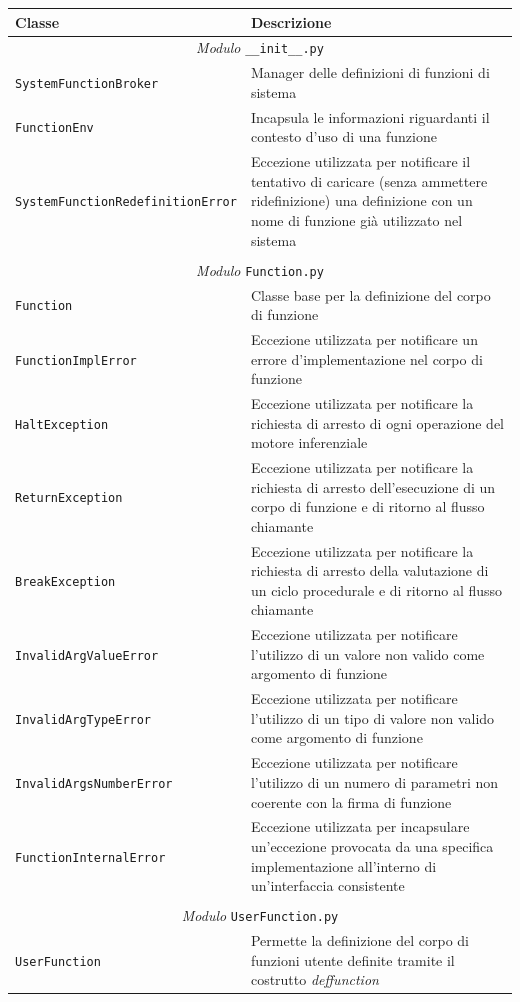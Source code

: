 \begin{longtable}{p{5.5cm}p{6.5cm}}
\hline 
\textbf{Classe} & \textbf{Descrizione} \\ 
\hline\hline 
\endhead

\multicolumn{2}{c}{\emph{Modulo} \texttt{\_\_init\_\_.py}}\\
	\hdashline[5pt/5pt]
		\texttt{SystemFunctionBroker} & Manager delle definizioni di funzioni di sistema \\ 
	\hdashline[1pt/5pt]
		\texttt{FunctionEnv} & Incapsula le informazioni riguardanti il contesto d'uso di una funzione\\ 
	\hdashline[1pt/5pt]
		\texttt{SystemFunctionRedefinitionError} & Eccezione utilizzata per notificare il tentativo di caricare (senza ammettere ridefinizione) una definizione con un nome di funzione già utilizzato nel sistema\\
	\hline\\
	
\multicolumn{2}{c}{\emph{Modulo} \texttt{Function.py}}\\
	\hdashline[5pt/5pt]
		\texttt{Function} & Classe base per la definizione del corpo di funzione \\ 
	\hdashline[1pt/5pt]
		\texttt{FunctionImplError} & Eccezione utilizzata per notificare un errore d'implementazione nel corpo di funzione\\ 
	\hdashline[1pt/5pt]
		\texttt{HaltException} & Eccezione utilizzata per notificare la richiesta di arresto di ogni operazione del motore inferenziale\\
	\hdashline[1pt/5pt]
		\texttt{ReturnException} & Eccezione utilizzata per notificare la richiesta di arresto dell'esecuzione di un corpo di funzione e di ritorno al flusso chiamante\\
	\hdashline[1pt/5pt]
		\texttt{BreakException} & Eccezione utilizzata per notificare la richiesta di arresto della valutazione di un ciclo procedurale e di ritorno al flusso chiamante\\
	\hdashline[1pt/5pt]
		\texttt{InvalidArgValueError} & Eccezione utilizzata per notificare l'utilizzo di un valore non valido come argomento di funzione\\
	\hdashline[1pt/5pt]
		\texttt{InvalidArgTypeError} & Eccezione utilizzata per notificare l'utilizzo di un tipo di valore non valido come argomento di funzione\\
	\hdashline[1pt/5pt]
		\texttt{InvalidArgsNumberError} & Eccezione utilizzata per notificare l'utilizzo di un numero di parametri non coerente con la firma di funzione\\
	\hdashline[1pt/5pt]
		\texttt{FunctionInternalError} & Eccezione utilizzata per incapsulare un'eccezione provocata da una specifica implementazione all'interno di un'interfaccia consistente\\
	\hline\\
	
\multicolumn{2}{c}{\emph{Modulo} \texttt{UserFunction.py}}\\
	\hdashline[5pt/5pt]
		\texttt{UserFunction} & Permette la definizione del corpo di funzioni utente definite tramite il costrutto \emph{deffunction} \\ 
	\hline	
\end{longtable}

